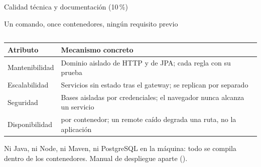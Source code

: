 %
%

%
       {Calidad técnica y documentación (10\,\%)}

\begin{frame}{Un comando, once contenedores, ningún requisito previo}

  \begin{columns}[c]
    \begin{column}{0.24\textwidth}\end{column}
    \begin{column}{0.24\textwidth}\end{column}
    \begin{column}{0.24\textwidth}\end{column}
    \begin{column}{0.24\textwidth}\end{column}
  \end{columns}

  \vspace{8pt}
  \begin{center}
    \scriptsize
    \begin{tabular}{@{}lL{7.4cm}@{}}
      \toprule
      \textbf{Atributo} & \textbf{Mecanismo concreto}\\
      \midrule
      Mantenibilidad & Dominio aislado de HTTP y de JPA; cada regla con su prueba\\
      Escalabilidad  & Servicios sin estado tras el gateway; se replican por separado\\
      Seguridad      & Bases aisladas por credenciales; el navegador nunca alcanza un servicio\\
      Disponibilidad &  por contenedor; un remote caído degrada una ruta, no la aplicación\\
      \bottomrule
    \end{tabular}
  \end{center}

  \vspace{-2pt}
  {\tiny\color{textoSuave} Ni Java, ni Node, ni Maven, ni PostgreSQL en la
  máquina: todo se compila dentro de los contenedores. Manual de despliegue
  aparte ().}
\end{frame}
